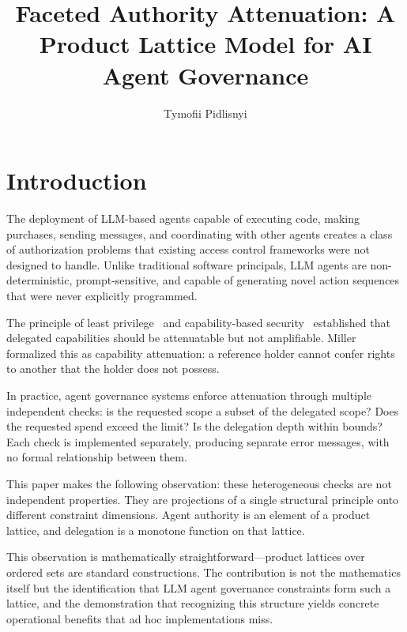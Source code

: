 \documentclass[sigconf,nonacm]{acmart}
\title{Faceted Authority Attenuation: A Product Lattice Model for AI Agent Governance}
\author{Tymofii Pidlisnyi}
\affiliation{%
  \institution{AEOESS}
  \city{Los Angeles}
  \state{California}
  \country{USA}
}
\begin{document}
\maketitle

\section{Introduction}

The deployment of LLM-based agents capable of executing code, making purchases, sending
messages, and coordinating with other agents creates a class of authorization problems
that existing access control frameworks were not designed to handle. Unlike traditional
software principals, LLM agents are non-deterministic, prompt-sensitive, and capable of
generating novel action sequences that were never explicitly programmed.

The principle of least privilege~\cite{saltzer1975} and capability-based
security~\cite{dennis1966} established that delegated capabilities should be attenuatable
but not amplifiable. Miller~\cite{miller2006} formalized this as capability attenuation:
a reference holder cannot confer rights to another that the holder does not possess.

In practice, agent governance systems enforce attenuation through multiple independent
checks: is the requested scope a subset of the delegated scope? Does the requested spend
exceed the limit? Is the delegation depth within bounds? Each check is implemented
separately, producing separate error messages, with no formal relationship between them.

This paper makes the following observation: these heterogeneous checks are not independent
properties. They are projections of a single structural principle onto different constraint
dimensions. Agent authority is an element of a product lattice, and delegation is a monotone
function on that lattice.

This observation is mathematically straightforward---product lattices over ordered sets
are standard constructions. The contribution is not the mathematics itself but the
identification that LLM agent governance constraints form such a lattice, and the
demonstration that recognizing this structure yields concrete operational benefits that
ad hoc implementations miss.
\end{document}
